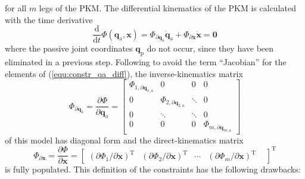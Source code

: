 \documentclass[robotics,article,accept,moreauthors,pdftex]{Definitions/mdpi}
\newcommand{\bm}[1]{\boldsymbol{#1}}
\newcommand{\transp}[0]{{\mathrm{T}}}
\let\Phi\varPhi
\begin{document}
%
for all $m$ legs of the PKM.
The differential kinematics of the PKM is calculated with the time derivative
%
\begin{equation}
\frac{\mathrm{d}}{{\mathrm{d}}t} \bm{\Phi}(\bm{q}_\mathrm{a},\bm{x})
=
\bm{\Phi}_{\partial \bm{q}_\mathrm{a}} \dot{\bm{q}}_\mathrm{a}
+
\bm{\Phi}_{\partial \bm{x}} \dot{\bm{x}}
=
\bm{0}
\label{equ:constr_qa_diff}
\end{equation}
%
where the passive joint coordinates $\bm{q}_{\mathrm{p}}$ do not occur, since they have been eliminated in a previous step.
Following \cite{Gogu2008} to avoid the term ``Jacobian'' for the elements of (\ref{equ:constr_qa_diff}),
the inverse-kinematics matrix
%
\begin{equation}
\bm{\Phi}_{\partial \bm{q}_{\mathrm{a}}}
=
\frac{\partial \bm{\Phi}}{\partial \bm{q}_{\mathrm{a}}}
=
\begin{bmatrix}
\Phi_{1,\partial \bm{q}_{1,\mathrm{a}}} & 0 & 0 & 0\\
0 & \Phi_{2,\partial \bm{q}_{2,\mathrm{a}}} & \ddots & 0 \\
0 & \ddots & \ddots & 0 \\
0 & 0 & 0 & \Phi_{m,\partial \bm{q}_{m,\mathrm{a}}}
\end{bmatrix}
\label{equ:PKM_phi_grad_q}
\end{equation}
%
of this model has diagonal form and the direct-kinematics matrix
%
\begin{equation}
\bm{\Phi}_{\partial \bm{x}}
=
\frac{\partial \bm{\Phi}}{\partial \bm{x}}
=
\begin{bmatrix}
(\partial \Phi_1/\partial \bm{x})^\transp &
(\partial \Phi_2/\partial \bm{x})^\transp &
\cdots &
(\partial \Phi_m/\partial \bm{x})^\transp &
\end{bmatrix}^\transp
\label{equ:PKM_phi_grad_x}
\end{equation}
%
is fully populated.
This definition of the constraints has the following drawbacks:
\end{document}
